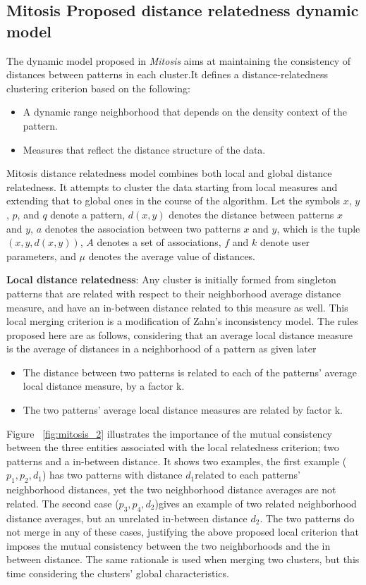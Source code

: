 \subsection{Mitosis Proposed distance relatedness dynamic model}\label{sec:mitosis_proposed}
The dynamic model proposed in \textit{Mitosis} aims at maintaining the consistency of distances between patterns in each cluster.It defines a
distance-relatedness clustering criterion based on the following:
\begin{itemize}
\item A dynamic range neighborhood that depends on the density context of the pattern.
\item Measures that reflect the distance structure of the data.
\end{itemize}

Mitosis distance relatedness model combines both local and global distance relatedness. 
It attempts to cluster the data starting from local measures and extending that to global ones in the course of the algorithm. 
Let the symbols $x$, $y$, $p$, and $q$ denote a pattern, $d(x,y)$ denotes the distance between patterns $x$ and $y$, $a$ denotes the association between two patterns $x$ and $y$, which is the tuple $(x,y,d(x,y))$, $A$ denotes a set of associations, $f$ and $k$ denote user parameters, and $\mu$ denotes the average value of distances.

\textbf{Local distance relatedness}: Any cluster is initially formed from singleton patterns that are related with respect to their neighborhood
average distance measure, and have an in-between distance related to this measure as well. This local merging criterion is a modification of Zahn's inconsistency model.
The rules proposed here are as follows, considering that an average local distance measure is the average of distances in a neighborhood of a pattern as given later
\begin{itemize}
\item The distance between two patterns is related to each of the patterns' average local distance measure, by a factor k.
\item The two patterns' average local distance measures are related by factor k.
\end{itemize}

Figure ~\ref{fig:mitosis_2} illustrates the importance of the mutual consistency between the three entities associated with the local relatedness
criterion; two patterns and a in-between distance. It shows two examples, the first example ($p_1, p_2, d_1$) has two patterns with distance $d_1$related to each patterns' neighborhood distances, yet the two neighborhood distance averages are not related. The second case ($p_3, p_4, d_2$)gives an example of two related neighborhood distance averages, but an unrelated in-between distance $d_2$. The two patterns do not merge in any of these cases, justifying the above proposed local criterion that imposes the mutual consistency between the two neighborhoods and the in between distance. 
The same rationale is used when merging two clusters, but this time considering the clusters' global characteristics.

